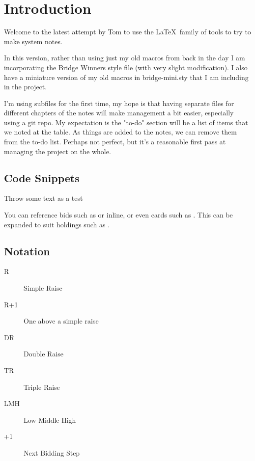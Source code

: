 \documentclass[tom-ari]{subfile}
\begin{document}
\chapter{Introduction}

Welcome to the latest attempt by Tom to use the \LaTeX~family of tools to try to make system notes.  

In this version, rather than using just my old macros from back in the day I am incorporating the Bridge Winners style file (with very slight modification).  I also have a miniature version of my old macros in bridge-mini.sty that I am including in the project.

I'm using subfiles for the first time, my hope is that having separate files for different chapters of the notes will make management a bit easier, especially using a git repo.  
My expectation is the "to-do" section will be a list of items that we noted at the table.  As things are added to the notes, we can remove them from the to-do list.  Perhaps not perfect, but it's a reasonable first pass at managing the project on the whole.

\section{Code Snippets}

Throw some text as a test


You can reference bids such as    or  inline, or even cards such as    . This can be expanded to suit holdings such as .

\section{Notation}

\begin{description}
	\item[R] Simple Raise
	\item[R+1] One above a simple raise
	\item[DR] Double Raise
	\item[TR] Triple Raise
	\item[LMH] Low-Middle-High
	\item[+1] Next Bidding Step
\end{description}
\end{document}
